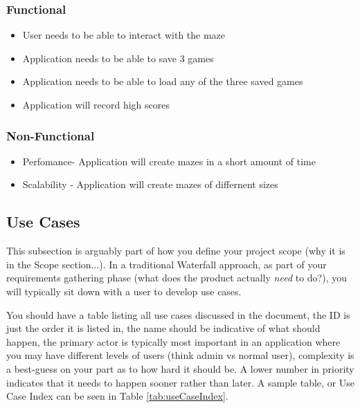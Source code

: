 \documentclass[10pt,conference,onecolumn,compsoc]{IEEEtran}
\begin{document}
\subsubsection{Functional}
\begin{itemize}
\item User needs to be able to interact with the maze
\item Application needs to be able to save 3 games
\item Application needs to be able to load any of the three saved games
\item Application will record high scores
\end{itemize}

\subsubsection{Non-Functional}
\begin{itemize}
\item Perfomance- Application will create mazes in a short amount of time
\item Scalability - Application will create mazes of differnent sizes
\end{itemize}

\subsection{Use Cases}
This subsection is arguably part of how you define your project scope (why it is in the Scope section...).  In a traditional Waterfall approach, as part of your requirements gathering phase (what does the product actually \emph{need} to do?), you will typically sit down with a user to develop use cases.

You should have a table listing all use cases discussed in the document, the ID is just the order it is listed in, the name should be indicative of what should happen, the primary actor is typically most important in an application where you may have different levels of users (think admin vs normal user), complexity is a best-guess on your part as to how hard it should be.  A lower number in priority indicates that it needs to happen sooner rather than later.  A sample table, or Use Case Index can be seen in Table \ref{tab:useCaseIndex}.
\end{document}
